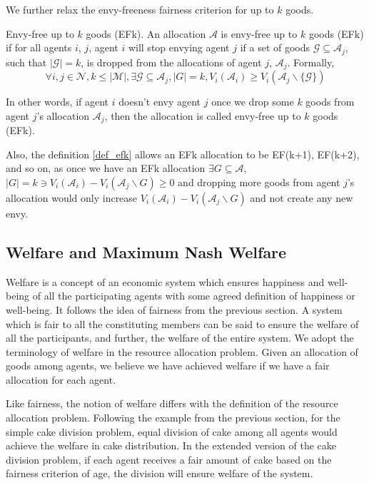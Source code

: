 We further relax the envy-freeness fairness criterion for up to $k$ goods.

\begin{definition}{Envy-free up to $k$ goods (EFk).}
\label{def_efk}
An allocation $\mathcal{A}$ is envy-free up to $k$ goods (EFk) if for all agents $i$, $j$, agent $i$ will stop envying agent $j$ if a set of goods $\mathcal{G} \subseteq \mathcal{A}_j$, such that $|\mathcal{G}| = k$, is dropped from the allocations of agent $j$, $\mathcal{A}_j$. Formally,
$$
    \forall i,j \in \mathcal{N}, k \leq |\mathcal{M}|, \exists \mathcal{G} \subseteq \mathcal{A}_j, |G| = k, V_i(\mathcal{A}_i) \geq V_i(\mathcal{A}_j \backslash \{\mathcal{G}\})
$$
\end{definition}

In other words, if agent $i$ doesn't envy agent $j$ once we drop some $k$ goods from agent $j$'s allocation $\mathcal{A}_j$, then the allocation is called envy-free up to $k$ goods (EFk).

Also, the definition \ref{def_efk} allows an EFk allocation to be EF(k+1), EF(k+2), and so on, as once we have an EFk allocation $ \exists G \subseteq \mathcal{A}$, $ |G|=k \ni V_i(\mathcal{A}_i) - V_i(\mathcal{A}_j \backslash G) \geq 0 $ and dropping more goods from agent $j$'s allocation would only increase $V_i(\mathcal{A}_i) - V_i(\mathcal{A}_j \backslash G)$ and not create any new envy.


\subsection{Welfare and Maximum Nash Welfare}
\label{section_welfare}
Welfare is a concept of an economic system which ensures happiness and well-being of all the participating agents with some agreed definition of happiness or well-being. It follows the idea of fairness from the previous section. A system which is fair to all the constituting members can be said to ensure the welfare of all the participants, and further, the welfare of the entire system. We adopt the terminology of welfare in the resource allocation problem. Given an allocation of goods among agents, we believe we have achieved welfare if we have a fair allocation for each agent.

Like fairness, the notion of welfare differs with the definition of the resource allocation problem. Following the example from the previous section, for the simple cake division problem, equal division of cake among all agents would achieve the welfare in cake distribution. In the extended version of the cake division problem, if each agent receives a fair amount of cake based on the fairness criterion of age, the division will ensure welfare of the system.

